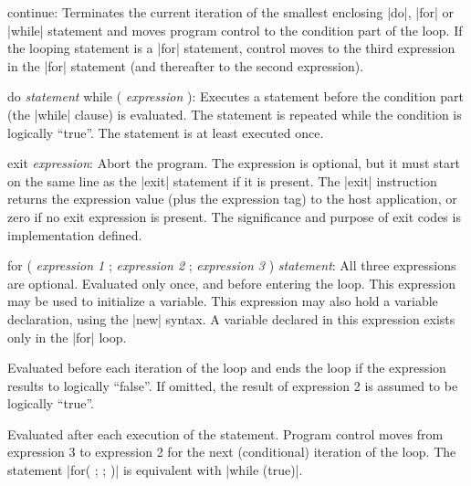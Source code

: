 \item continue:
        Terminates the current iteration of the smallest enclosing |do|, |for|
        or |while| statement and moves program control to the condition part
        of the loop. If the looping statement is a |for| statement, control
        moves to the third expression in the |for| statement (and thereafter
        to the second expression).

\item do {\it statement\/} while ( {\it expression\/} ):
        Executes a statement before the condition part (the |while| clause) is
        evaluated. The statement is repeated while the condition is logically
        ``true''. The statement is at least executed once.

\item exit {\it expression\/}:
        Abort the program. The expression is optional, but it must start on the
        same line as the |exit| statement if it is present. The |exit|
        instruction returns the expression value (plus the expression tag) to
        the host application, or zero if no exit expression is present. The
        significance and purpose of exit codes is implementation defined.

\item for ( {\it expression 1\/} ; {\it expression 2\/} ; {\it expression 3\/} ) {\it statement\/}:
        All three expressions are optional.
        \beginlist{60pt}
                Evaluated only once, and before entering the loop. This
                expression may be used to initialize a variable.
                This expression may also hold a variable declaration, using the
                |new| syntax. A variable declared in this expression exists
                only in the |for| loop.

                Evaluated before each iteration of the loop and ends the loop
                if the expression results to logically ``false''. If omitted,
                the result of expression 2 is assumed to be logically
                ``true''.

                Evaluated after each execution of the statement. Program
                control moves from expression 3 to expression 2 for the next
                (conditional) iteration of the loop.
        \endlist
        The statement |for( ; ; )| is equivalent with |while (true)|.

